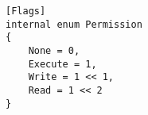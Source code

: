 \begin{listing}[htbp]
\begin{verbatim}
[Flags]
internal enum Permission
{
    None = 0,
    Execute = 1,
    Write = 1 << 1,
    Read = 1 << 2
}
\end{verbatim}
\caption{Flags Enum}
\label{flagsEnum}
\end{listing}